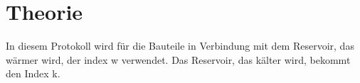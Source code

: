 \section{Theorie}
In diesem Protokoll wird für die Bauteile in Verbindung mit dem Reservoir, das wärmer wird,
der index w verwendet. 
Das Reservoir, das kälter wird, bekommt den Index k.












